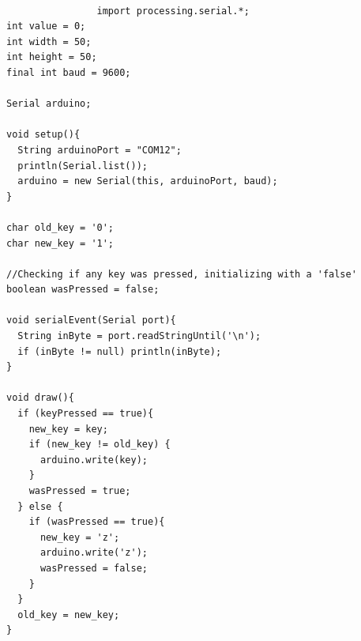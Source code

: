 \documentclass[14pt,a4paper]{extarticle}
\begin{document}
		\begin{verbatim}
		
				import processing.serial.*;
int value = 0;
int width = 50;
int height = 50;
final int baud = 9600;

Serial arduino;

void setup(){
  String arduinoPort = "COM12";
  println(Serial.list());
  arduino = new Serial(this, arduinoPort, baud);
}

char old_key = '0';
char new_key = '1';

//Checking if any key was pressed, initializing with a 'false'
boolean wasPressed = false;

void serialEvent(Serial port){
  String inByte = port.readStringUntil('\n');
  if (inByte != null) println(inByte);
}

void draw(){
  if (keyPressed == true){
    new_key = key;
    if (new_key != old_key) {
      arduino.write(key);
    }
    wasPressed = true;
  } else {
    if (wasPressed == true){
      new_key = 'z';
      arduino.write('z');
      wasPressed = false;
    }
  }
  old_key = new_key;
}
		
		\end{verbatim}

	
\end{document}
